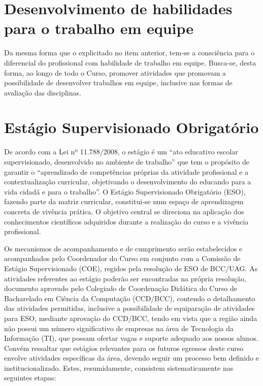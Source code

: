 \documentclass[
	12pt,				%
	openright,			%
  oneside,     %
	a4paper,			%
	english,			%
	french,				%
	spanish,			%
	brazil				%
	]{abntex2}
\begin{document}
\section{Desenvolvimento de habilidades para o trabalho em equipe}

Da mesma forma que o  explicitado no item anterior, tem-se a consciência para o
diferencial do profissional com  habilidade de trabalho em equipe. Busca-se,
desta forma, ao longo de todo o  Curso, promover atividades que promovam a
possibilidade de desenvolver trabalhos  em equipe, inclusive nas formas de
avaliação das disciplinas.

\section{Estágio Supervisionado Obrigatório}

De acordo com a Lei nº 11.788/2008, o estágio é um ``ato educativo escolar supervisionado, desenvolvido no ambiente de trabalho'' que tem o propósito de garantir o “aprendizado de competências próprias da atividade profissional e a contextualização curricular, objetivando o desenvolvimento do educando para a vida cidadã e para o trabalho”. O Estágio Supervisionado Obrigatório (ESO), fazendo parte da matriz curricular, constitui-se num espaço de aprendizagem concreta de vivência prática. O objetivo central se direciona na aplicação dos conhecimentos científicos adquiridos durante a realização do curso e a vivência profissional.

Os mecanismos de acompanhamento e de cumprimento serão estabelecidos e acompanhados pelo Coordenador do Curso em conjunto com a Comissão de Estágio Supervisionado (COE), regidos pela resolução de ESO de BCC/UAG. As atividades referentes ao estágio poderão ser encontradas na própria resolução, documento aprovado pelo Colegiado de Coordenação Didática do Curso de Bacharelado em Ciência da Computação (CCD/BCC), contendo o detalhamento das atividades permitidas, inclusive a possibilidade de equiparação de atividades para ESO, mediante aprovação do CCD/BCC, tendo em vista que a região ainda não possui um número significativo de empresas na área de Tecnologia da Informação (TI), que possam ofertar vagas e suporte adequado aos nossos alunos. Convém ressaltar que estágios relevantes para os futuros egressos deste curso envolve atividades específicas da área, devendo seguir um processo bem definido e institucionalizado. Estes, resumidamente, consistem sistematicamente nas seguintes etapas:
\end{document}
